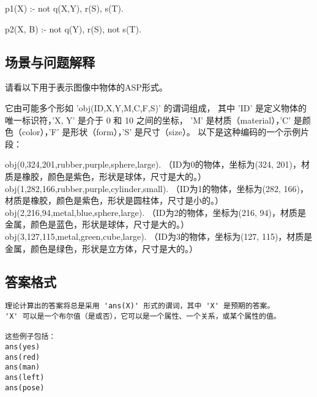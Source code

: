 p1(X) :- not q(X,Y), r(S), s(T).

p2(X, B) :- not q(Y), r(S), not s(T).
\subsection{场景与问题解释}
\label{appendix:scene-question-explanation}
请看以下用于表示图像中物体的ASP形式。

它由可能多个形如 'obj(ID,X,Y,M,C,F,S)' 的谓词组成，
其中 'ID' 是定义物体的唯一标识符，'X, Y' 是介于 0 和 10 之间的坐标，
'M' 是材质（material），'C' 是颜色（color），'F' 是形状（form），'S' 是尺寸（size）。
以下是这种编码的一个示例片段：

obj(0,324,201,rubber,purple,sphere,large). （ID为0的物体，坐标为(324, 201)，材质是橡胶，颜色是紫色，形状是球体，尺寸是大的。）
obj(1,282,166,rubber,purple,cylinder,small). （ID为1的物体，坐标为(282, 166)，材质是橡胶，颜色是紫色，形状是圆柱体，尺寸是小的。）
obj(2,216,94,metal,blue,sphere,large).   （ID为2的物体，坐标为(216, 94)，材质是金属，颜色是蓝色，形状是球体，尺寸是大的。）
obj(3,127,115,metal,green,cube,large).   （ID为3的物体，坐标为(127, 115)，材质是金属，颜色是绿色，形状是立方体，尺寸是大的。）
\subsection{答案格式}
\begin{lstlisting}
理论计算出的答案将总是采用 'ans(X)' 形式的谓词，其中 'X' 是预期的答案。
'X' 可以是一个布尔值（是或否），它可以是一个属性、一个关系，或某个属性的值。

这些例子包括：
ans(yes)
ans(red)
ans(man)
ans(left)
ans(pose)
\end{lstlisting}

